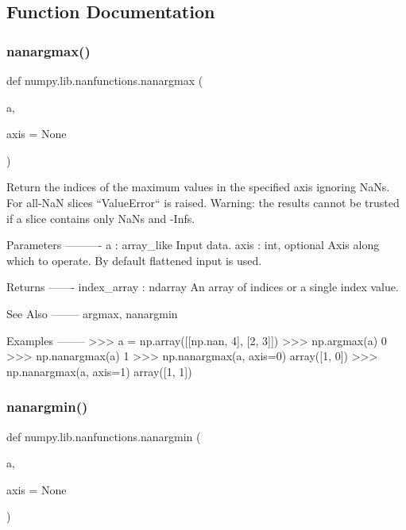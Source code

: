\subsection{Function Documentation}
\mbox{\label{namespacenumpy_1_1lib_1_1nanfunctions_a23fc5bd2a6de7b40b293243ed9cd95c7}} 
\subsubsection{\texorpdfstring{nanargmax()}{nanargmax()}}
{\footnotesize\ttfamily def numpy.\+lib.\+nanfunctions.\+nanargmax (\begin{DoxyParamCaption}\item[{}]{a,  }\item[{}]{axis = {\ttfamily None} }\end{DoxyParamCaption})}

\begin{DoxyVerb}Return the indices of the maximum values in the specified axis ignoring
NaNs. For all-NaN slices ``ValueError`` is raised. Warning: the
results cannot be trusted if a slice contains only NaNs and -Infs.


Parameters
----------
a : array_like
    Input data.
axis : int, optional
    Axis along which to operate.  By default flattened input is used.

Returns
-------
index_array : ndarray
    An array of indices or a single index value.

See Also
--------
argmax, nanargmin

Examples
--------
>>> a = np.array([[np.nan, 4], [2, 3]])
>>> np.argmax(a)
0
>>> np.nanargmax(a)
1
>>> np.nanargmax(a, axis=0)
array([1, 0])
>>> np.nanargmax(a, axis=1)
array([1, 1])\end{DoxyVerb}
 \mbox{\label{namespacenumpy_1_1lib_1_1nanfunctions_a835b6215d99db0102994600c63acb588}} 
\subsubsection{\texorpdfstring{nanargmin()}{nanargmin()}}
{\footnotesize\ttfamily def numpy.\+lib.\+nanfunctions.\+nanargmin (\begin{DoxyParamCaption}\item[{}]{a,  }\item[{}]{axis = {\ttfamily None} }\end{DoxyParamCaption})}

